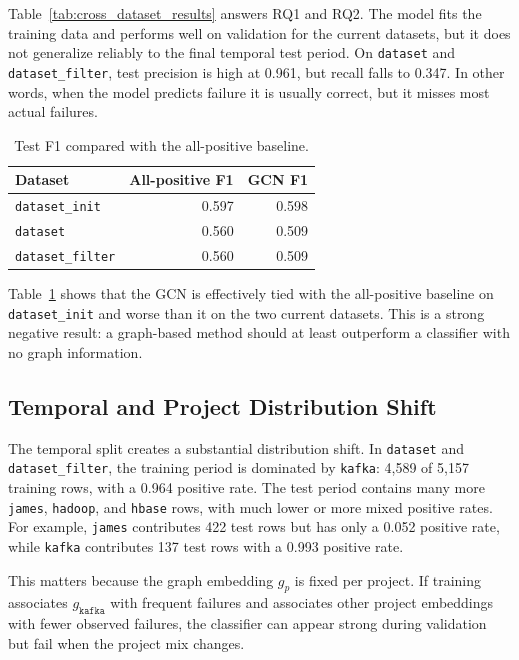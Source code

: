 Table~\ref{tab:cross_dataset_results} answers RQ1 and RQ2. The model fits the training data and performs well on validation for the current datasets, but it does not generalize reliably to the final temporal test period. On \texttt{dataset} and \texttt{dataset\_filter}, test precision is high at 0.961, but recall falls to 0.347. In other words, when the model predicts failure it is usually correct, but it misses most actual failures.

\begin{table}[ht]
    \centering
    \caption{Test F1 compared with the all-positive baseline.}
    \label{tab:baseline_results}
    \begin{tabular}{lrr}
        \toprule
        Dataset & All-positive F1 & GCN F1 \\
        \midrule
        \texttt{dataset\_init} & 0.597 & 0.598 \\
        \texttt{dataset} & 0.560 & 0.509 \\
        \texttt{dataset\_filter} & 0.560 & 0.509 \\
        \bottomrule
    \end{tabular}
\end{table}

Table~\ref{tab:baseline_results} shows that the GCN is effectively tied with the all-positive baseline on \texttt{dataset\_init} and worse than it on the two current datasets. This is a strong negative result: a graph-based method should at least outperform a classifier with no graph information.

\subsection{Temporal and Project Distribution Shift}

The temporal split creates a substantial distribution shift. In \texttt{dataset} and \texttt{dataset\_filter}, the training period is dominated by \texttt{kafka}: 4,589 of 5,157 training rows, with a 0.964 positive rate. The test period contains many more \texttt{james}, \texttt{hadoop}, and \texttt{hbase} rows, with much lower or more mixed positive rates. For example, \texttt{james} contributes 422 test rows but has only a 0.052 positive rate, while \texttt{kafka} contributes 137 test rows with a 0.993 positive rate.

This matters because the graph embedding $g_p$ is fixed per project. If training associates $g_{\texttt{kafka}}$ with frequent failures and associates other project embeddings with fewer observed failures, the classifier can appear strong during validation but fail when the project mix changes.


